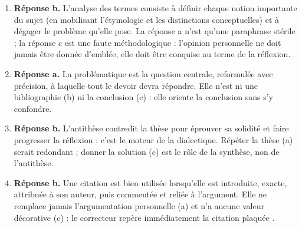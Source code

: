 \documentclass[11pt]{article}
\begin{document}
\begin{corrige}
\begin{enumerate}
\item \textbf{Réponse b.} L'analyse des termes consiste à définir chaque notion importante du sujet (en mobilisant l'étymologie et les distinctions conceptuelles) et à dégager le problème qu'elle pose. La réponse a n'est qu'une paraphrase stérile ; la réponse c est une faute méthodologique : l'opinion personnelle ne doit jamais être donnée d'emblée, elle doit être conquise au terme de la réflexion.
\item \textbf{Réponse a.} La problématique est la question centrale, reformulée avec précision, à laquelle tout le devoir devra répondre. Elle n'est ni une bibliographie (b) ni la conclusion (c) : elle oriente la conclusion sans s'y confondre.
\item \textbf{Réponse b.} L'antithèse contredit la thèse pour éprouver sa solidité et faire progresser la réflexion : c'est le moteur de la dialectique. Répéter la thèse (a) serait redondant ; donner la solution (c) est le rôle de la synthèse, non de l'antithèse.
\item \textbf{Réponse b.} Une citation est bien utilisée lorsqu'elle est introduite, exacte, attribuée à son auteur, puis commentée et reliée à l'argument. Elle ne remplace jamais l'argumentation personnelle (a) et n'a aucune valeur décorative (c) : le correcteur repère immédiatement la citation \guillemotleft plaquée \guillemotright.
\end{enumerate}
\end{corrige}
\end{document}
